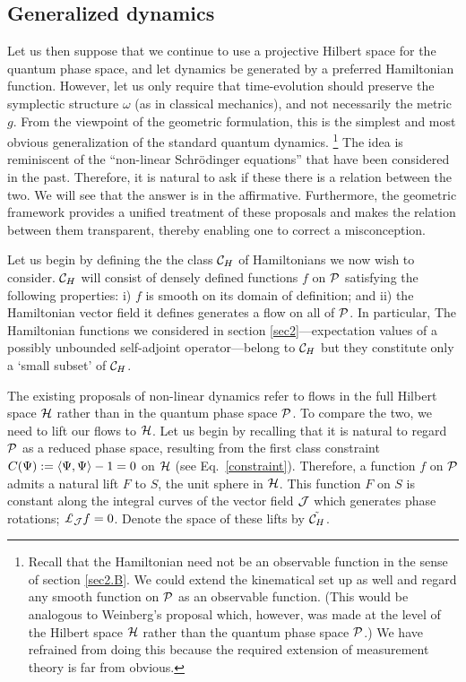 \subsection{Generalized dynamics} \label{sec3.A}

Let us then suppose that we continue to use a projective Hilbert space
for the quantum phase space, and let dynamics be generated by a
preferred Hamiltonian function. However, let us only require that
time-evolution should preserve the symplectic structure $\omega$ (as
in classical mechanics), and not necessarily the metric $g$. {}From
the viewpoint of the geometric formulation, this is the simplest and
most obvious generalization of the standard quantum dynamics.%
%
\footnote{Recall that the Hamiltonian need not be an observable
function in the sense of section \ref{sec2.B}. We could extend the
kinematical set up as well and regard any smooth function on $\P$ as
an observable function.  (This would be analogous to Weinberg's
\cite{weinberg} proposal which, however, was made at the level of the
Hilbert space $\H$ rather than the quantum phase space $\P$.) We have
refrained from doing this because the required extension of
measurement theory is far from obvious.}  
% 
The idea is reminiscent of the ``non-linear Schr\"odinger equations''
that have been considered in the past. Therefore, it is
natural to ask if these there is a relation between the two.  We will
see that the answer is in the affirmative. Furthermore, the geometric
framework provides a unified treatment of these proposals and makes
the relation between them transparent, thereby enabling one to correct
a misconception.

Let us begin by defining the the class $\ch$ of Hamiltonians we now
wish to consider. $\ch$ will consist of densely defined functions $f$
on $\P$ satisfying the following properties: i) $f$ is smooth on its
domain of definition; and ii) the Hamiltonian vector field it defines
generates a flow on all of $\P$.  In particular, The Hamiltonian
functions we considered in section \ref{sec2}---expectation values of
a possibly unbounded self-adjoint operator---belong to $\ch$ but they
constitute only a `small subset' of $\ch$.

The existing proposals of non-linear dynamics refer to flows in the
full Hilbert space $\H$ rather than in the quantum phase space $\P$.
To compare the two, we need to lift our flows to $\H$.  Let us begin
by recalling that it is natural to regard $\P$ as a reduced phase
space, resulting from the first class constraint $ C(\Psi) := \< \Psi,
\Psi\> -1 =0$ on $\H$ (see Eq.~\ref{constraint}).  Therefore, a
function $f$ on $\P$ admits a natural lift $F$ to $S$, the unit sphere
in $\H$. This function $F$ on $S$ is constant along the integral
curves of the vector field $\J$ which generates phase rotations;
$\lie{\J}f = 0$. Denote the space of these lifts by $\tilde\ch$.


